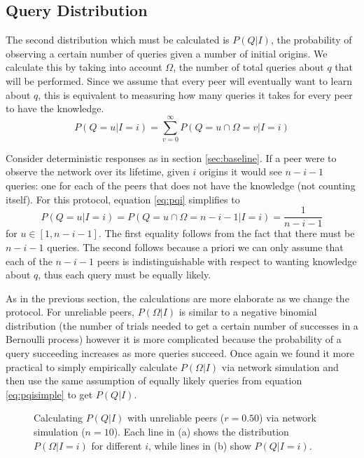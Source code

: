\documentclass{article}
\newcommand{\eqnref}[1]{equation \eqref{eq:#1}}
\newcommand{\secref}[1]{section \ref{sec:#1}}
\begin{document}
\subsection{Query Distribution}\label{sec:qgiveni}

The second distribution which must be calculated is $P(Q|I)$, the probability of
observing a certain number of queries given a number of initial origins. We
calculate this by taking into account $\Omega$, the number of total queries
about $q$ that will be performed. Since we assume that every peer will
eventually want to learn about $q$, this is equivalent to measuring how many
queries it takes for every peer to have the knowledge.
\begin{equation}\label{eq:pqi}
	P(Q=u|I=i)=\sum_{v=0}^\infty P(Q=u\cap\Omega=v|I=i)
\end{equation}

Consider deterministic responses as in \secref{baseline}. If a peer were to
observe the network over its lifetime, given $i$ origins it would see $n-i-1$
queries: one for each of the peers that does not have the knowledge (not
counting itself). For this protocol, \eqnref{pqi} simplifies to
\begin{equation}\label{eq:pqisimple}
	P(Q=u|I=i)=P(Q=u\cap\Omega=n-i-1|I=i)=\frac{1}{n-i-1}
\end{equation}
for $u\in[1,n-i-1]$. The first equality follows from the fact that there must be
$n-i-1$ queries. The second follows because a priori we can only assume that
each of the $n-i-1$ peers is indistinguishable with respect to wanting knowledge
about $q$, thus each query must be equally likely.

As in the previous section, the calculations are more elaborate as we change the
protocol. For unreliable peers, $P(\Omega|I)$ is similar to a negative binomial
distribution (the number of trials needed to get a certain number of successes
in a Bernoulli process) however it is more complicated because the probability
of a query succeeding increases as more queries succeed. Once again we found it
more practical to simply empirically calculate $P(\Omega|I)$ via network
simulation and then use the same assumption of equally likely queries from
\eqnref{pqisimple} to get $P(Q|I)$.


\begin{figure}%
    \centering
	\caption{Calculating $P(Q|I)$ with unreliable peers ($r=0.50$) via network
	simulation ($n=10$). Each line in (a) shows the distribution
	$P(\Omega|I=i)$ for different $i$, while lines in (b) show $P(Q|I=i)$.}
    \label{fig:unreliable}%
\end{figure}
\end{document}
